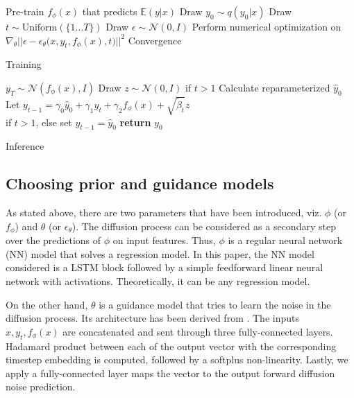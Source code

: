 \documentclass{article}
\begin{document}
\noindent\begin{minipage}{0.47\textwidth}
\begin{algorithm}[H]
  \begin{algorithmic}[1]
    \STATE Pre-train $f_{\phi}(x)$ that predicts $\mathbb{E}(y | x)$
    \REPEAT
    \STATE Draw $y_0\sim q( y_0 | x)$
    \STATE Draw $t\sim \text{Uniform}(\{1\dots T\})$
    \STATE Draw $\epsilon\sim\mathcal{N}(0, I)$
    \STATE Perform numerical optimization on\\ $\nabla_\theta \big|\big|\epsilon - \epsilon_\theta\big(x, y_t, f_{\phi}( x), t\big)\big|\big|^2$
    \vspace*{4pt}
    \UNTIL Convergence
  \end{algorithmic}
  \caption{Training}
  \label{alg:reg_form_1_train}
\end{algorithm}
\end{minipage}
\hfill
\noindent\begin{minipage}{0.49\textwidth}
\begin{algorithm}[H]
  \begin{algorithmic}[1]
    \STATE $ y_T\sim\mathcal{N}(f_{\phi}( x), I)$
    \STATE Draw $ z\sim\mathcal{N}(0, I) $ if $t>1$
    \STATE Calculate reparameterized $\hat{ y}_0$
    \STATE Let $ y_{t-1}=\gamma_0\hat{ y}_0+\gamma_1 y_t+\gamma_2f_{\phi}( x)+\sqrt{\tilde{\beta}_t} z$ \\ if $t>1$, else set $ y_{t-1}=\hat{ y}_0$
    \ENDFOR
    \STATE \textbf{return} $ y_0$
  \end{algorithmic}
  \caption{Inference}
  \label{alg:reg_form_1_inf}
\end{algorithm}
\end{minipage}  

\subsection{Choosing prior and guidance models}

As stated above, there are two parameters that have been introduced, viz. $\phi$ (or $f_\phi$) and $\theta$ (or $\epsilon_\theta$). The diffusion process can be considered as a secondary step over the predictions of $\phi$ on input features. Thus, $\phi$ is a regular neural network (NN) model that solves a regression model. In this paper, the NN model considered is a LSTM block followed by a simple feedforward linear neural network with activations. Theoretically, it can be any regression model.

On the other hand, $\theta$ is a guidance model that tries to learn the noise in the diffusion process. Its architecture has been derived from \citet{han2022card}. The inputs $x, y_t,f_\phi(x)$ are concatenated and sent through three fully-connected layers. Hadamard product between each of the output vector with the corresponding timestep embedding is computed, followed by a softplus non-linearity. Lastly, we apply a fully-connected layer maps the vector to the output forward diffusion noise prediction.
\end{document}
